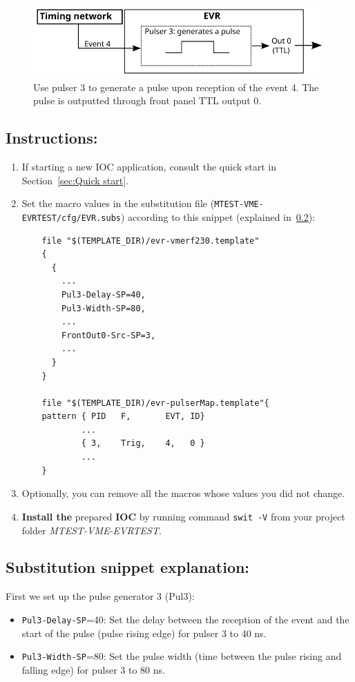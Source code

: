 \documentclass[12pt,a4paper]{article}
\begin{document}
\begin{figure}[H]
	\centering
	\includegraphics[]{./img/pulser}
	\caption{Use pulser 3 to generate a pulse upon reception of the event 4. The pulse is outputted through front panel TTL output 0.}
	\label{fig:pulser}
\end{figure}

\subsection{Instructions:}
\begin{enumerate}
	\item If starting a new IOC application, consult the quick start in Section~\ref{sec:Quick start}.

	\item Set the macro values in the substitution file (\texttt{MTEST-VME-EVRTEST/cfg/EVR.subs}) according to this snippet (explained in~\ref{sec:explain_pulser}):
\begin{verbatim}
	file "$(TEMPLATE_DIR)/evr-vmerf230.template"
	{
	  {
	    ...
	    Pul3-Delay-SP=40,
	    Pul3-Width-SP=80,
	    ...
	    FrontOut0-Src-SP=3,
	    ...
	  }
	}

	file "$(TEMPLATE_DIR)/evr-pulserMap.template"{
	pattern { PID   F,       EVT, ID}
	        ...
	        { 3,    Trig,    4,   0 }
	        ...
	}
\end{verbatim}

	\item Optionally, you can remove all the macros whose values you did not change. 
	\item \textbf{Install the} prepared \textbf{IOC} by running command \texttt{swit -V} from your project folder \textit{MTEST-VME-EVRTEST}.
\end{enumerate}
\subsection{Substitution snippet explanation:}\label{sec:explain_pulser}

First we set up the pulse generator 3 (Pul3):
\begin{itemize}
	\item \texttt{Pul3-Delay-SP}=40: Set the delay between the reception of the event and the start of the pulse (pulse rising edge) for pulser 3 to 40 ns. 
	\item \texttt{Pul3-Width-SP}=80: Set the pulse width (time between the pulse rising and falling edge) for pulser 3 to 80 ns.
\end{itemize}
\end{document}

